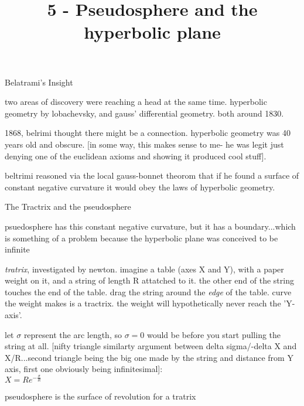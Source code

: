 \documentclass{article}
\title{5 - Pseudosphere and the hyperbolic plane}
\newenvironment{andrew_section}[1]
    {
    \section{#1}
    \begin{itemize}
    }
    {
    \end{itemize}
    }
\begin{document}
\maketitle

\begin{andrew_section}{Belatrami's Insight}
    \item 
        two areas of discovery were reaching a head at the same time.
        hyperbolic geometry by lobachevsky, and gauss' differential geometry.
        both around 1830.
    \item 
        1868, belrimi thought there might be a connection. hyperbolic
        geometry was 40 years old and obscure.  [in some way, this makes
        sense to me- he was legit just denying one of the euclidean axioms
        and showing it produced cool stuff].
    \item 
        beltrimi reasoned via the local gauss-bonnet theorom
        that if he found a surface of constant negative curvature
        it would obey the laws of hyperbolic geometry.
\end{andrew_section}

\begin{andrew_section}{The Tractrix and the pseudosphere}
    \item 
        psuedosphere has this constant negative curvature, but it has
        a boundary...which is something of a problem because the hyperbolic
        plane was conceived to be infinite
    \item 
        \emph{tratrix}, investigated by newton.  imagine a table (axes X and Y),
        with a paper weight on it, and a string of length R attatched to it.
        the other end of the string touches the end of the table.  drag the
        string around the \emph{edge} of the table. curve the weight makes
        is a tractrix.  the weight will hypothetically never reach the 'Y-axis'.
    \item 
        let $\sigma$ represent the arc length, so $\sigma=0$ would be
        before you start pulling the string at all.  [nifty triangle similarty
        argument between delta sigma/-delta X and X/R...second triangle being
        the big one made by the string and distance from Y axis, first one
        obviously being infinitesimal]: \\ $X = Re^{-\frac{\sigma}{R}}$
    \item 
        pseudosphere is the surface of revolution for a tratrix
\end{andrew_section}
\end{document}
